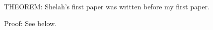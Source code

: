 



\nocite{big}
\nocite{Sh:1}
\nocite{small} 

THEOREM: Shelah's first paper \cite{Sh:1} was written before my first
paper\cite{big}. 

Proof: See below. 


